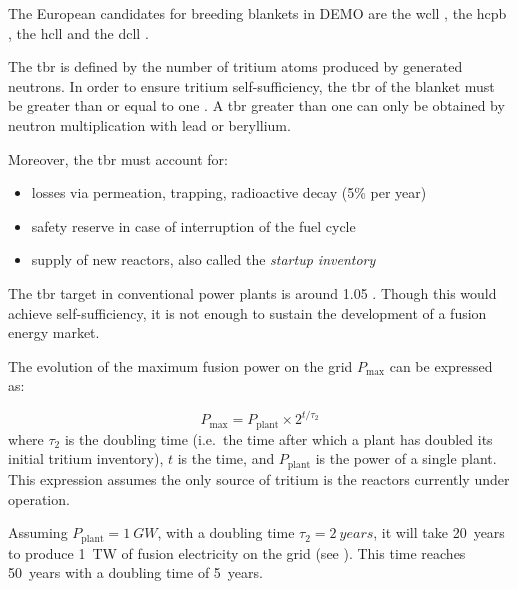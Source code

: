 The European candidates for \glspl{breeding blanket} in DEMO are the \gls{wcll} , the \gls{hcpb} , the \gls{hcll}  and the \gls{dcll}  .

The \gls{tbr} is defined by the number of tritium atoms produced by generated neutrons.
In order to ensure tritium self-sufficiency, the \gls{tbr} of the blanket must be greater than or equal to one .
A \gls{tbr} greater than one can only be obtained by neutron multiplication with lead or beryllium.

Moreover, the \gls{tbr} must account for:
\begin{itemize}
    \item losses via \gls{permeation}, \gls{trapping}, radioactive decay (5\% per year)
    \item safety reserve in case of interruption of the fuel cycle
    \item supply of new reactors, also called the \emph{\gls{startup inventory}}
\end{itemize}

The \gls{tbr} target in conventional power plants is around 1.05 .
Though this would achieve self-sufficiency, it is not enough to sustain the development of a fusion energy market.

The evolution of the maximum fusion power on the grid $P_\mathrm{max}$ can be expressed as:

\begin{equation}
    P_\mathrm{max} = P_\mathrm{plant} \times 2^{t/\tau_2}
\end{equation}
where $\tau_2$ is the doubling time (i.e.\ the time after which a plant has doubled its initial tritium \gls{inventory}), $t$ is the time, and $P_\mathrm{plant}$ is the power of a single plant.
This expression assumes the only source of tritium is the reactors currently under operation.

Assuming $P_\mathrm{plant} = \SI{1}{GW}$, with a doubling time $\tau_2 = \SI{2}{years}$, it will take \SI{20}{years} to produce \SI{1}{TW} of fusion electricity on the grid (see ).
This time reaches \SI{50}{years} with a doubling time of \SI{5}{years}.

